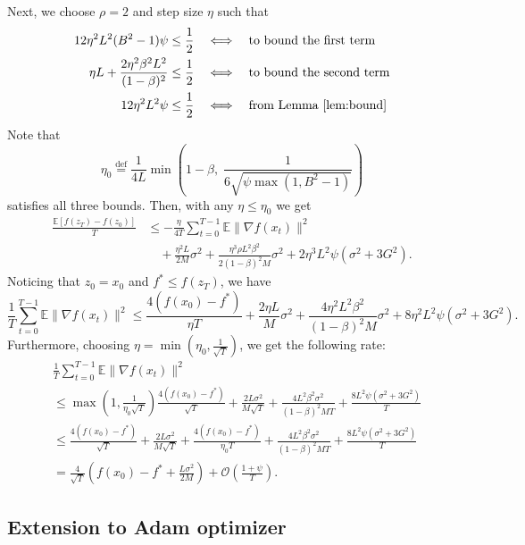 Next, we choose $\rho = 2$ and step size $\eta$ such that
\begin{align*}
12\eta^2 L^2(B^2-1)\psi &\leq \frac{1}{2} & &\Longleftrightarrow \quad \text{to bound the first term} \\
\eta L + \frac{2\eta^2\beta^2 L^2}{(1-\beta)^2} &\leq \frac{1}{2} & &\Longleftrightarrow \quad \text{to bound the second term} \\
12\eta^2 L^2\psi &\leq \frac{1}{2} & &\Longleftrightarrow \quad \text{from Lemma~\ref{lem:bound}}
\end{align*}
Note that
\[
\eta_0 \stackrel{\text{def}}{=} \frac{1}{4L}\min\!\left(1-\beta,\; \frac{1}{6\sqrt{\psi\max(1,B^2-1)}}\right)
\]
satisfies all three bounds. Then, with any $\eta \leq \eta_0$ we get
\begin{align*}
\frac{\mathbb{E}[f(z_T) - f(z_0)]}{T}
&\leq -\frac{\eta}{4T}\sum_{t=0}^{T-1}\mathbb{E}\|\nabla f(x_t)\|^2 \\
&\quad + \frac{\eta^2 L}{2M}\sigma^2
  + \frac{\eta^3\rho L^2\beta^2}{2(1-\beta)^2 M}\sigma^2
  + 2\eta^3 L^2\psi(\sigma^2 + 3G^2).
\end{align*}
Noticing that $z_0 = x_0$ and $f^* \leq f(z_T)$, we have
\[
\frac{1}{T}\sum_{t=0}^{T-1}\mathbb{E}\|\nabla f(x_t)\|^2
\leq \frac{4(f(x_0) - f^*)}{\eta T}
  + \frac{2\eta L}{M}\sigma^2
  + \frac{4\eta^2 L^2\beta^2}{(1-\beta)^2 M}\sigma^2
  + 8\eta^2 L^2\psi(\sigma^2 + 3G^2).
\]
Furthermore, choosing $\eta = \min(\eta_0, \frac{1}{\sqrt{T}})$, we get the following rate:
\begin{align*}
&\frac{1}{T}\sum_{t=0}^{T-1}\mathbb{E}\|\nabla f(x_t)\|^2 \\
&\leq \max\!\left(1, \frac{1}{\eta_0\sqrt{T}}\right)\frac{4(f(x_0)-f^*)}{\sqrt{T}}
  + \frac{2L\sigma^2}{M\sqrt{T}}
  + \frac{4L^2\beta^2\sigma^2}{(1-\beta)^2 MT}
  + \frac{8L^2\psi(\sigma^2+3G^2)}{T} \\
&\leq \frac{4(f(x_0)-f^*)}{\sqrt{T}}
  + \frac{2L\sigma^2}{M\sqrt{T}}
  + \frac{4(f(x_0)-f^*)}{\eta_0 T}
  + \frac{4L^2\beta^2\sigma^2}{(1-\beta)^2 MT}
  + \frac{8L^2\psi(\sigma^2+3G^2)}{T} \\
&= \frac{4}{\sqrt{T}}\left(f(x_0) - f^* + \frac{L\sigma^2}{2M}\right)
  + \mathcal{O}\!\left(\frac{1+\psi}{T}\right).
\end{align*}

\subsection{Extension to Adam optimizer}
\label{sec:adam_extension}

